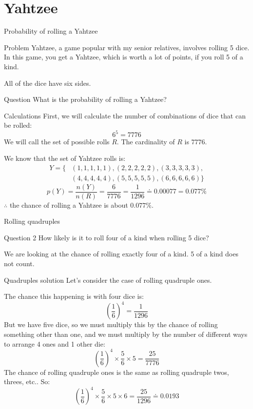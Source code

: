	\section{Yahtzee}
	\begin{namedframe}{Probability of rolling a Yahtzee}
		\begin{exampleblock}{Problem}
			Yahtzee, a game popular with my senior relatives, involves rolling 5 dice. In this game, you get a Yahtzee, which is worth a lot of points, if you roll 5 of a kind.

			All of the dice have six sides.
		\end{exampleblock}
		\begin{exampleblock}{Question}
			What is the probability of rolling a Yahtzee?
		\end{exampleblock}
	\end{namedframe}
	\begin{namedframe}{Calculations}
		First, we will calculate the number of combinations of dice that can be rolled:
		\pause
		\[6^5 = 7776\]
		We will call the set of possible rolls $R$. The cardinality of $R$ is $7776$.
		\pause

		We know that the set of Yahtzee rolls is:
		\begin{align*}
			Y = \{&(1,1,1,1,1), (2,2,2,2,2), (3,3,3,3,3),\\
			      &(4,4,4,4,4), (5,5,5,5,5), (6,6,6,6,6)\}
		\end{align*}
		\pause
		\[p(Y) = \frac{n(Y)}{n(R)} = \frac{6}{7776} = \frac{1}{1296} \doteq 0.00077 = 0.077\%\]
		$\therefore$ the chance of rolling a Yahtzee is about $0.077\%$.
	\end{namedframe}
	\begin{namedframe}{Rolling quadruples}
		\begin{exampleblock}{Question 2}
			How likely is it to roll four of a kind when rolling 5 dice?
		\end{exampleblock}
		We are looking at the chance of rolling \alert{exactly} four of a kind. 5 of a kind does \alert{not} count.
	\end{namedframe}
	\begin{namedframe}{Quadruples solution}
		Let's consider the case of rolling quadruple ones.
		\pause

		The chance this happening is with four dice is:
		\[\left(\frac{1}{6}\right)^4 = \frac{1}{1296}\]
		\pause
		But we have five dice, so we must multiply this by the chance of rolling something other than one, and we must multiply by the number of different ways to arrange 4 ones and 1 other die:
		\[\left(\frac{1}{6}\right)^4 \times \frac{5}{6} \times 5 = \frac{25}{7776}\]
		\pause
		The chance of rolling quadruple ones is the same as rolling quadruple twos, threes, etc.. So:
		\[\left(\frac{1}{6}\right)^4 \times \frac{5}{6} \times 5 \times 6 = \frac{25}{1296} \doteq 0.0193\]
	\end{namedframe}
